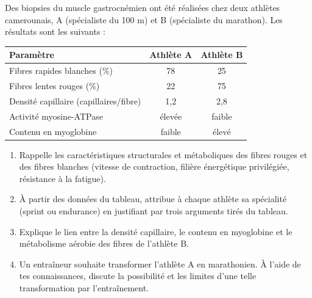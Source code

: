 \documentclass[11pt]{article}
\begin{document}
\begin{exercice}
Des biopsies du muscle gastrocnémien ont été réalisées chez deux athlètes camerounais, A (spécialiste du 100 m) et B (spécialiste du marathon). Les résultats sont les suivants :
\begin{center}
\begin{tabular}{|l|c|c|}
\hline
\rowcolor{popblueL} Paramètre & Athlète A & Athlète B \\
\hline Fibres rapides blanches (\%) & 78 & 25 \\
\hline Fibres lentes rouges (\%) & 22 & 75 \\
\hline Densité capillaire (capillaires/fibre) & 1,2 & 2,8 \\
\hline Activité myosine-ATPase & élevée & faible \\
\hline Contenu en myoglobine & faible & élevé \\
\hline
\end{tabular}
\end{center}
\begin{enumerate}
\item Rappelle les caractéristiques structurales et métaboliques des fibres rouges et des fibres blanches (vitesse de contraction, filière énergétique privilégiée, résistance à la fatigue).
\item À partir des données du tableau, attribue à chaque athlète sa spécialité (sprint ou endurance) en justifiant par trois arguments tirés du tableau.
\item Explique le lien entre la densité capillaire, le contenu en myoglobine et le métabolisme aérobie des fibres de l'athlète B.
\item Un entraîneur souhaite transformer l'athlète A en marathonien. À l'aide de tes connaissances, discute la possibilité et les limites d'une telle transformation par l'entraînement.
\end{enumerate}
\end{exercice}
\end{document}
